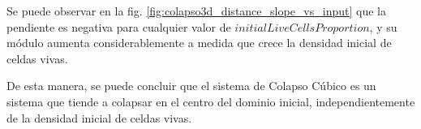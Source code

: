 Se puede observar en la fig. \ref{fig:colapso3d_distance_slope_vs_input} que la pendiente es negativa
para cualquier valor de $initialLiveCellsProportion$, y su módulo aumenta considerablemente
a medida que crece la densidad inicial de celdas vivas.




De esta manera, se puede concluir que el sistema de Colapso Cúbico es un sistema que tiende a
colapsar en el centro del dominio inicial, independientemente de la densidad inicial de celdas vivas.
